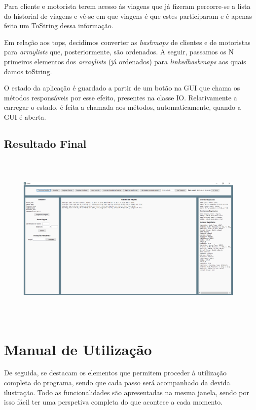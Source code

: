 \documentclass[a4paper]{article}
\begin{document}
Para cliente e motorista terem acesso às viagens que já fizeram percorre-se a lista do historial de viagens e vê-se em que viagens é que estes participaram e é apenas feito um ToString dessa informação.

Em relação aos tops, decidimos converter as \textit{hashmaps} de clientes e de motoristas para \textit{arraylists} que, posteriormente, são ordenados. A seguir, passamos os N primeiros elementos dos \textit{arraylists} (já ordenados) para \textit{linkedhashmaps} aos quais damos toString.

O estado da aplicação é guardado a partir de um botão na GUI que chama os métodos responsáveis por esse efeito, presentes na classe IO. Relativamente a carregar o estado, é feita a chamada aos métodos, automaticamente, quando a GUI é aberta.
\subsection{Resultado Final}
\begin{figure}[htbp]
    \centering
    \includegraphics[width = 420pt, height = 240pt]{gui}
\end{figure}

\section{Manual de Utilização}
De seguida, se destacam os elementos que permitem proceder à utilização completa do programa, sendo que cada passo será acompanhado da devida ilustração. Todo as funcionalidades são apresentadas na mesma janela, sendo por isso fácil ter uma perspetiva completa do que acontece a cada momento.
\end{document}
